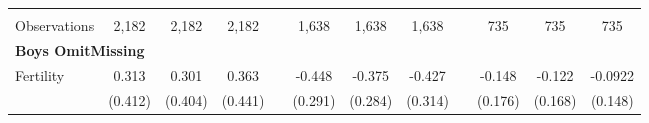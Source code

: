 \begin{landscape}
\begin{table}[htpb!]
\begin{center}
\begin{tabular}{lcccp{2mm}cccp{2mm}ccc}
\begin{footnotesize}\end{footnotesize}&\begin{footnotesize}\end{footnotesize}&\begin{footnotesize}\end{footnotesize}&\begin{footnotesize}\end{footnotesize}&\begin{footnotesize}\end{footnotesize}&\begin{footnotesize}\end{footnotesize}&\begin{footnotesize}\end{footnotesize}&\begin{footnotesize}\end{footnotesize}&\begin{footnotesize}\end{footnotesize}&\begin{footnotesize}\end{footnotesize}&\begin{footnotesize}\end{footnotesize}&\begin{footnotesize}\end{footnotesize}\\Observations&2,182&2,182&2,182&&1,638&1,638&1,638&&735&735&735\\
\multicolumn{12}{l}{\textbf{Boys OmitMissing}}\\ 
Fertility&0.313&0.301&0.363&&-0.448&-0.375&-0.427&&-0.148&-0.122&-0.0922\\
&(0.412)&(0.404)&(0.441)&&(0.291)&(0.284)&(0.314)&&(0.176)&(0.168)&(0.148)\\

\end{tabular}
\end{center}
\end{table}
\end{landscape}
